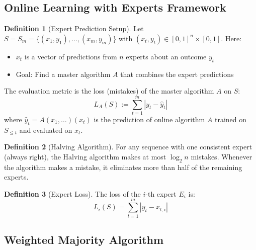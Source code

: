 \documentclass[12pt,a4paper]{article}
\theoremstyle{definition}
\newtheorem{definition}{Definition}[section]
\begin{document}
\subsection{Online Learning with Experts Framework}

\begin{definition}[Expert Prediction Setup]
Let $S = S_m = \{(x_1, y_1), \ldots, (x_m, y_m)\}$ with $(x_t, y_t) \in [0,1]^n \times [0,1]$. Here:
\begin{itemize}
    \item $x_t$ is a vector of predictions from $n$ experts about an outcome $y_t$
    \item Goal: Find a master algorithm $A$ that combines the expert predictions
\end{itemize}

The evaluation metric is the loss (mistakes) of the master algorithm $A$ on $S$:
\[
L_A(S) := \sum_{t=1}^m |y_t - \hat{y}_t|
\]
where $\hat{y}_t = A(x_1, \ldots)(x_t)$ is the prediction of online algorithm $A$ trained on $S_{\leq t}$ and evaluated on $x_t$.
\end{definition}

\begin{definition}[Halving Algorithm]
For any sequence with one consistent expert (always right), the Halving algorithm makes at most $\log_2 n$ mistakes. Whenever the algorithm makes a mistake, it eliminates more than half of the remaining experts.
\end{definition}

\begin{definition}[Expert Loss]
The loss of the $i$-th expert $E_i$ is:
\[
L_i(S) = \sum_{t=1}^m |y_t - x_{t,i}|
\]
\end{definition}

\subsection{Weighted Majority Algorithm}
\end{document}
